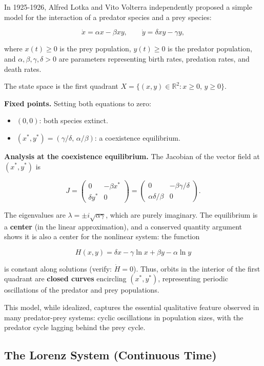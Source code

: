 In 1925-1926, Alfred Lotka and Vito Volterra independently proposed a simple model for the interaction of a predator species and a prey species:

\[
\dot{x} = \alpha x - \beta xy, \qquad \dot{y} = \delta xy - \gamma y,
\]

where $x(t) \geq 0$ is the prey population, $y(t) \geq 0$ is the predator population, and $\alpha, \beta, \gamma, \delta > 0$ are parameters representing birth rates, predation rates, and death rates.

The state space is the first quadrant $X = \{(x, y) \in \mathbb{R}^2 : x \geq 0, \, y \geq 0\}$.

\textbf{Fixed points.} Setting both equations to zero:
\begin{itemize}[nosep]
  \item $(0, 0)$: both species extinct.
  \item $(x^*, y^*) = (\gamma/\delta, \, \alpha/\beta)$: a coexistence equilibrium.
\end{itemize}

\textbf{Analysis at the coexistence equilibrium.} The Jacobian of the vector field at $(x^*, y^*)$ is

\[
J = \begin{pmatrix} 0 & -\beta x^* \\ \delta y^* & 0 \end{pmatrix} = \begin{pmatrix} 0 & -\beta\gamma/\delta \\ \alpha\delta/\beta & 0 \end{pmatrix}.
\]

The eigenvalues are $\lambda = \pm i\sqrt{\alpha\gamma}$, which are purely imaginary. The equilibrium is a \textbf{center} (in the linear approximation), and a conserved quantity argument shows it is also a center for the nonlinear system: the function

\[
H(x, y) = \delta x - \gamma \ln x + \beta y - \alpha \ln y
\]

is constant along solutions (verify: $\dot{H} = 0$). Thus, orbits in the interior of the first quadrant are \textbf{closed curves} encircling $(x^*, y^*)$, representing periodic oscillations of the predator and prey populations.

This model, while idealized, captures the essential qualitative feature observed in many predator-prey systems: cyclic oscillations in population sizes, with the predator cycle lagging behind the prey cycle.

\subsection{The Lorenz System (Continuous Time)}\label{sec:1.4.5}


